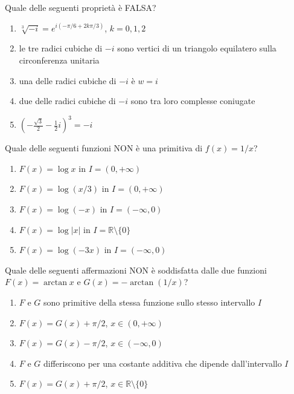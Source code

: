 \begin{quiz}
Quale delle seguenti propriet\`a \`e FALSA?
\begin{enumerate}[label=\alph*),leftmargin=1.3cm,itemsep=3pt,topsep=5pt]
\item $\sqrt[3]{-i}=e^{i(-\pi/6+2k\pi/3)}$, $k=0,1,2$
\item le tre radici cubiche di $-i$ sono vertici di un triangolo equilatero sulla circonferenza unitaria
\item una delle radici cubiche di $-i$ \`e $w=i$
\item due delle radici cubiche di $-i$ sono tra loro complesse coniugate
\item $(-\frac{\sqrt3}{2}-\frac12i)^3=-i$
\end{enumerate}
\end{quiz}

\begin{quiz}
Quale delle seguenti funzioni NON \`e una primitiva di $f(x)=1/x$?
\begin{enumerate}[label=\alph*),leftmargin=1.3cm,itemsep=3pt,topsep=5pt]
\item $F(x)=\log x$ in $I=(0,+\infty)$
\item $F(x)=\log(x/3)$ in $I=(0,+\infty)$
\item $F(x)=\log(-x)$ in $I=(-\infty,0)$
\item $F(x)=\log|x|$ in $I=\mathbb R\setminus\{0\}$
\item $F(x)=\log(-3x)$ in $I=(-\infty,0)$
\end{enumerate}
\end{quiz}

\begin{quiz}
Quale delle seguenti affermazioni NON \`e soddisfatta dalle due funzioni $F(x)=\arctan x$ e $G(x)=-\arctan(1/x)$?
\begin{enumerate}[label=\alph*),leftmargin=1.3cm,itemsep=3pt,topsep=5pt]
\item $F$ e $G$ sono primitive della stessa funzione sullo stesso intervallo $I$
\item $F(x)=G(x)+\pi/2$, $x\in(0,+\infty)$
\item $F(x)=G(x)-\pi/2$, $x\in(-\infty,0)$
\item $F$ e $G$ differiscono per una costante additiva che dipende dall'intervallo $I$
\item $F(x)=G(x)+\pi/2$, $x\in\mathbb R\setminus\{0\}$
\end{enumerate}
\end{quiz}

